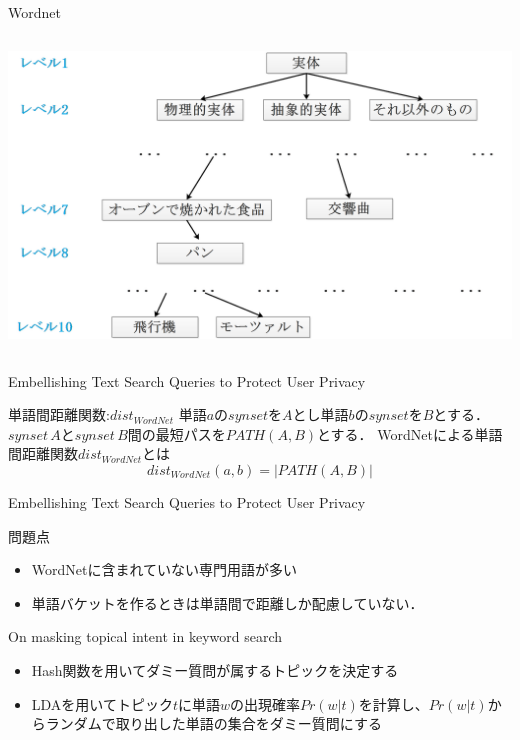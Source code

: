 \documentclass[14pt,xcolor=dvipsnames,table,dvipdfmx]{beamer}
\begin{document}
\begin{frame}{Wordnet}
	\begin{columns}[t]
		\begin{column}{1.0\textwidth} %
			\includegraphics[width=\columnwidth]{rk15.png}
		\end{column}
	\end{columns}
\end{frame}

\begin{frame}{Embellishing Text Search Queries to Protect User Privacy \cite{embellishing2010}}
	\begin{block}{単語間距離関数:$dist_{WordNet}$}
		単語$a$の$synset$を$A$とし単語$b$の$synset$を$B$とする．
		$synset \, A$と$synset \, B$間の最短パスを$PATH(A,B)$とする．
		WordNetによる単語間距離関数$dist_{WordNet}$とは
		\begin{equation}
			dist_{WordNet}(a,b) = |PATH(A,B)|
		\end{equation}
	\end{block}
\end{frame}

\begin{frame}{Embellishing Text Search Queries to Protect User Privacy \cite{embellishing2010}}
	\begin{block}{問題点}
		\begin{itemize}
			\item 	WordNetに含まれていない専門用語が多い
			\item 	単語バケットを作るときは単語間で距離しか配慮していない．
		\end{itemize}
	\end{block}
\end{frame}

\begin{frame}{On masking topical intent in keyword search \cite{masking2014}}
	\begin{block}{}
		\begin{itemize}
			\item 	Hash関数を用いてダミー質問が属するトピックを決定する
			\item	LDAを用いてトピック$t$に単語$w$の出現確率$Pr(w|t)$を計算し、$Pr(w|t)$からランダムで取り出した単語の集合をダミー質問にする
		\end{itemize}
	\end{block}
\end{frame}
\end{document}
